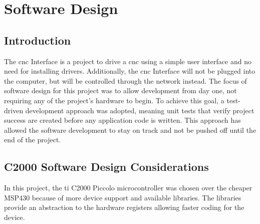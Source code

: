 \section{Software Design}

\subsection{Introduction}
The \gls{cnc} Interface is a project to drive a \gls{cnc} using a simple user interface and no need for installing drivers.
Additionally, the \gls{cnc} Interface will not be plugged into the computer, but will be controlled through the network instead.
The focus of software design for this project was to allow development from day one, not requiring any of the project's hardware to begin.
To achieve this goal, a test-driven development approach was adopted, meaning unit tests that verify project success are created before any application code is written.
This approach has allowed the software development to stay on track and not be pushed off until the end of the project.

\subsection{C2000 Software Design Considerations}
In this project, the \gls{ti} C2000 Piccolo microcontroller was chosen over the cheaper MSP430 because of more device support and available libraries.
The libraries provide an abstraction to the hardware registers allowing faster coding for the device. 

